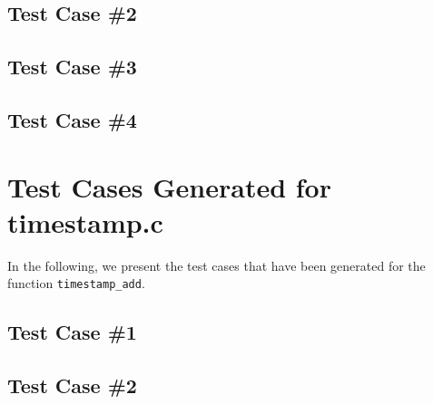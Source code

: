 \subsection{Test Case \#2}


\subsection{Test Case \#3}


\subsection{Test Case \#4}




\newpage
\section{Test Cases Generated for timestamp.c}

In the following, we present the test cases that have been generated for the function \texttt{timestamp\_add}.

\subsection{Test Case \#1}


\subsection{Test Case \#2}



